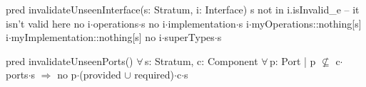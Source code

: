 pred invalidateUnseenInterface(s: Stratum, i: Interface)
{
  s not in i.isInvalid_e -- it isn't valid here
  no i$\cdot$operations$\cdot$s
  no i$\cdot$implementation$\cdot$s
  i$\cdot$myOperations::nothing[s]
  i$\cdot$myImplementation::nothing[s]
  no i$\cdot$superTypes$\cdot$s
}

pred invalidateUnseenPorts()
{
  $\forall\,$s: Stratum, c: Component
  {
    $\forall\,$p: Port |
      p $\not\subseteq$ c$\cdot$ports$\cdot$s $\Longrightarrow$
        no p$\cdot$(provided $\cup$ required)$\cdot$c$\cdot$s
  }
}
